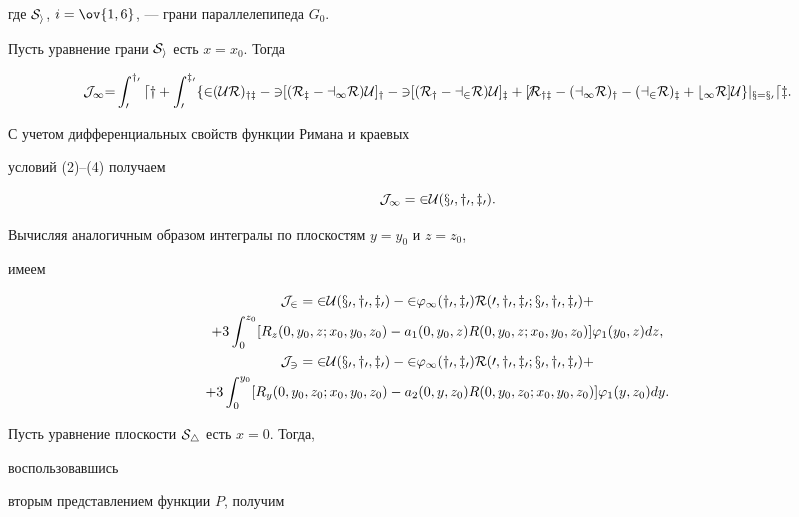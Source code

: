 где $\cal S_i$, $i=\ov{1,6}$, --- грани параллелепипеда $G_0$. 


 


Пусть уравнение грани $\cal S_i$ есть $x=x_0$. Тогда 


$$ 


\J_1{=}\int^{y_0}_0 dy+\int^{z_0}_0\{2(\U R)_{yz}- 


3[(R_z-a_1R)\U]_y-3[(R_y-a_2R)\U]_z+ 


6[R_{yz}-(a_1R)_y-(a_2R)_z+b_1R]\U\}|_{x=x_0}dz. 


$$ 


С учетом дифференциальных свойств функции Римана и краевых 


условий (2)--(4) получаем 


$$ 


\J_1=2\U(x_0,y_0,z_0). 


$$ 


Вычисляя аналогичным образом интегралы по плоскостям $y=y_0$ и $z=z_0$, 


имеем 


\begin{gather*} 


\J_2=2\U(x_0,y_0,z_0)-2\varphi_1(y_0,z_0)R(0,y_0,z_0;x_0,y_0,z_0)+\\ 


+3\int^{z_0}_0[R_z(0,y_0,z;x_0,y_0,z_0)-a_1(0,y_0,z) 


R(0,y_0,z;x_0,y_0,z_0)]\varphi_1(y_0,z)dz,\\ 


% 


\J_3=2\U(x_0,y_0,z_0)-2\varphi_1(y_0,z_0)R(0,y_0,z_0;x_0,y_0,z_0)+ \\


+3\int^{y_0}_0[R_y(0,y_0,z_0;x_0,y_0,z_0)-a_2(0,y,z_0) 


R(0,y_0,z_0;x_0,y_0,z_0)]\varphi_1(y,z_0)dy.\end{gather*} 


 


Пусть уравнение плоскости $\cal S_4$ есть $x=0$. Тогда, 


воспользовавшись 


вторым представлением функции $P$, получим 


